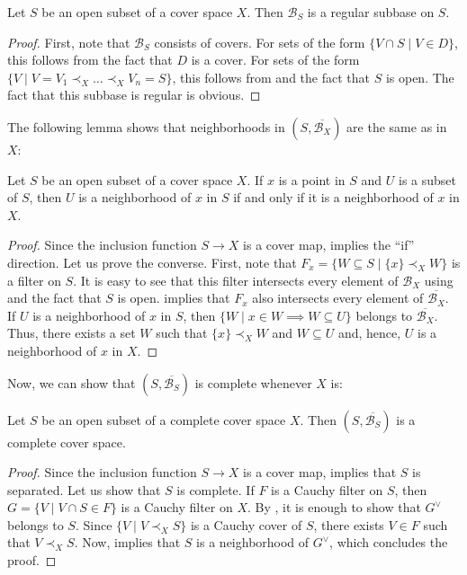 \documentclass[reqno]{amsart}
\theoremstyle{definition}
\theoremstyle{remark}
\numberwithin{figure}{section}
\newcommand{\rb}{\prec}
\begin{document}
\begin{lem}
Let $S$ be an open subset of a cover space $X$.
Then $\mathcal{B}_S$ is a regular subbase on $S$.
\end{lem}
\begin{proof}
First, note that $\mathcal{B}_S$ consists of covers.
For sets of the form $\{ V \cap S \mid V \in D \}$, this follows from the fact that $D$ is a cover.
For sets of the form $\{ V \mid V = V_1 \rb_X \ldots \rb_X V_n = S \}$, this follows from  and the fact that $S$ is open.
The fact that this subbase is regular is obvious.
\end{proof}

The following lemma shows that neighborhoods in $(S,\overline{\mathcal{B}_X})$ are the same as in $X$:

\begin{lem}
Let $S$ be an open subset of a cover space $X$.
If $x$ is a point in $S$ and $U$ is a subset of $S$, then $U$ is a neighborhood of $x$ in $S$ if and only if it is a neighborhood of $x$ in $X$.
\end{lem}
\begin{proof}
Since the inclusion function $S \to X$ is a cover map,  implies the ``if'' direction.
Let us prove the converse.
First, note that $F_x = \{ W \subseteq S \mid \{ x \} \rb_X W \}$ is a filter on $S$.
It is easy to see that this filter intersects every element of $\mathcal{B}_X$ using  and the fact that $S$ is open.
 implies that $F_x$ also intersects every element of $\overline{\mathcal{B}_X}$.
If $U$ is a neighborhood of $x$ in $S$, then $\{ W \mid x \in W \implies W \subseteq U \}$ belongs to $\overline{\mathcal{B}_X}$.
Thus, there exists a set $W$ such that $\{ x \} \rb_X W$ and $W \subseteq U$ and, hence, $U$ is a neighborhood of $x$ in $X$.
\end{proof}

Now, we can show that $(S,\overline{\mathcal{B}_S})$ is complete whenever $X$ is:

\begin{prop}
Let $S$ be an open subset of a complete cover space $X$.
Then $(S,\overline{\mathcal{B}_S})$ is a complete cover space.
\end{prop}
\begin{proof}
Since the inclusion function $S \to X$ is a cover map,  implies that $S$ is separated.
Let us show that $S$ is complete.
If $F$ is a Cauchy filter on $S$, then $G = \{ V \mid V \cap S \in F \}$ is a Cauchy filter on $X$.
By , it is enough to show that $G^\vee$ belongs to $S$.
Since $\{ V \mid V \rb_X S \}$ is a Cauchy cover of $S$, there exists $V \in F$ such that $V \rb_X S$.
Now,  implies that $S$ is a neighborhood of $G^\vee$, which concludes the proof.
\end{proof}
\end{document}
